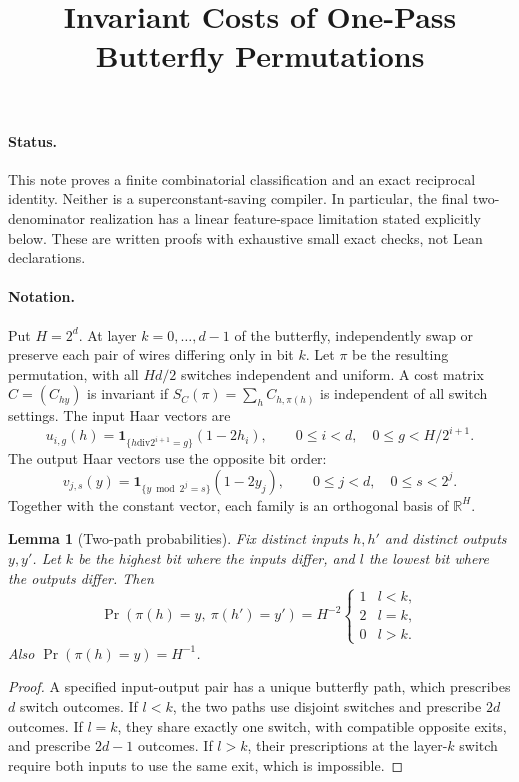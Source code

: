 \documentclass[11pt]{article}
\title{Invariant Costs of One-Pass Butterfly Permutations}
\author{}\date{}
\newtheorem{lemma}{Lemma}
\begin{document}
\maketitle

\paragraph{Status.}
This note proves a finite combinatorial classification and an exact
reciprocal identity. Neither is a superconstant-saving compiler. In
particular, the final two-denominator realization has a linear
feature-space limitation stated explicitly below. These are written
proofs with exhaustive small exact checks, not Lean declarations.

\paragraph{Notation.}
Put $H=2^d$. At layer $k=0,\ldots,d-1$ of the butterfly, independently
swap or preserve each pair of wires differing only in bit $k$.
Let $\pi$ be the resulting permutation, with all $Hd/2$ switches
independent and uniform. A cost matrix $C=(C_{hy})$ is invariant if
$S_C(\pi)=\sum_h C_{h,\pi(h)}$ is independent of all switch settings.
The input Haar vectors are
\[
 u_{i,g}(h)=\mathbf1_{\{h\mathbin{\mathrm{div}}2^{i+1}=g\}}
                   (1-2h_i),\qquad
 0\leq i<d,\quad 0\leq g<H/2^{i+1}.
\]
The output Haar vectors use the opposite bit order:
\[
 v_{j,s}(y)=\mathbf1_{\{y\bmod2^j=s\}}(1-2y_j),\qquad
 0\leq j<d,\quad 0\leq s<2^j.
\]
Together with the constant vector, each family is an orthogonal basis
of $\mathbb R^H$.

\begin{lemma}[Two-path probabilities]
Fix distinct inputs $h,h'$ and distinct outputs $y,y'$. Let $k$ be
the highest bit where the inputs differ, and $l$ the lowest bit where
the outputs differ. Then
\[
 \Pr(\pi(h)=y,\ \pi(h')=y')=
 H^{-2}\begin{cases}1&l<k,\\2&l=k,\\0&l>k.\end{cases}       \tag{1}
\]
Also $\Pr(\pi(h)=y)=H^{-1}$.
\end{lemma}
\begin{proof}
A specified input-output pair has a unique butterfly path, which
prescribes $d$ switch outcomes. If $l<k$, the two paths use disjoint
switches and prescribe $2d$ outcomes. If $l=k$, they share exactly
one switch, with compatible opposite exits, and prescribe $2d-1$
outcomes. If $l>k$, their prescriptions at the layer-$k$ switch
require both inputs to use the same exit, which is impossible.
\end{proof}
\end{document}
